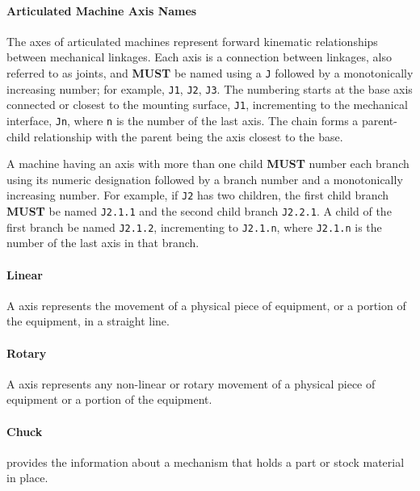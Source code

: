 \paragraph{Articulated Machine Axis Names}
\label{sec:Articulated Machine Axis Names}

The axes of articulated machines represent forward kinematic relationships between mechanical linkages. Each axis is a connection between linkages, also referred to as joints, and \textbf{MUST} be named using a \texttt{J} followed by a monotonically increasing number; for example, \texttt{J1}, \texttt{J2}, \texttt{J3}.  The numbering starts at the base axis connected or closest to the mounting surface, \texttt{J1}, incrementing to the mechanical interface, \texttt{Jn}, where \texttt{n} is the number of the last axis. The chain forms a parent-child relationship with the parent being the axis closest to the base.

A machine having an axis with more than one child \textbf{MUST} number each branch using its numeric designation followed by a branch number and a monotonically increasing number. For example, if \texttt{J2} has two children, the first child branch \textbf{MUST} be named \texttt{J2.1.1} and the second child branch \texttt{J2.2.1}. A child of the first branch \MUST be named \texttt{J2.1.2}, incrementing to \texttt{J2.1.n}, where \texttt{J2.1.n} is the number of the last axis in that branch.


\paragraph{Linear}\mbox{}
\label{sec:Linear}


A  axis represents the movement of a physical piece of equipment, or a portion of the equipment, in a straight line. 


\paragraph{Rotary}\mbox{}
\label{sec:Rotary}


A  axis represents any non-linear or rotary movement of a physical piece of equipment or a portion of the equipment.


\paragraph{Chuck}\mbox{}
\label{sec:Chuck}


 provides the information about a mechanism that holds a part or stock material in place.


